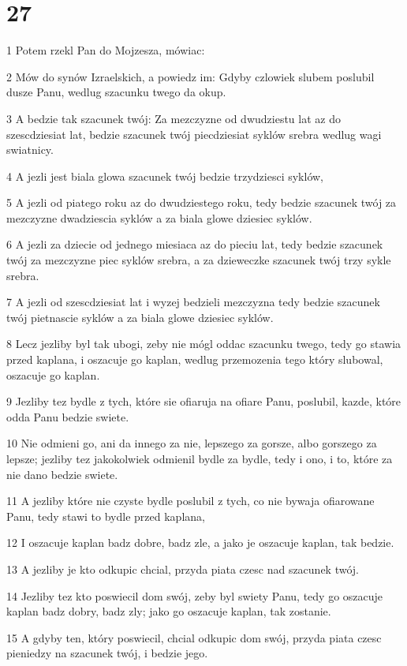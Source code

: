 \chapter{27}

\par 1 Potem rzekl Pan do Mojzesza, mówiac:
\par 2 Mów do synów Izraelskich, a powiedz im: Gdyby czlowiek slubem poslubil dusze Panu, wedlug szacunku twego da okup.
\par 3 A bedzie tak szacunek twój: Za mezczyzne od dwudziestu lat az do szescdziesiat lat, bedzie szacunek twój piecdziesiat syklów srebra wedlug wagi swiatnicy.
\par 4 A jezli jest biala glowa szacunek twój bedzie trzydziesci syklów,
\par 5 A jezli od piatego roku az do dwudziestego roku, tedy bedzie szacunek twój za mezczyzne dwadziescia syklów a za biala glowe dziesiec syklów.
\par 6 A jezli za dziecie od jednego miesiaca az do pieciu lat, tedy bedzie szacunek twój za mezczyzne piec syklów srebra, a za dzieweczke szacunek twój trzy sykle srebra.
\par 7 A jezli od szescdziesiat lat i wyzej bedzieli mezczyzna tedy bedzie szacunek twój pietnascie syklów a za biala glowe dziesiec syklów.
\par 8 Lecz jezliby byl tak ubogi, zeby nie mógl oddac szacunku twego, tedy go stawia przed kaplana, i oszacuje go kaplan, wedlug przemozenia tego który slubowal, oszacuje go kaplan.
\par 9 Jezliby tez bydle z tych, które sie ofiaruja na ofiare Panu, poslubil, kazde, które odda Panu bedzie swiete.
\par 10 Nie odmieni go, ani da innego za nie, lepszego za gorsze, albo gorszego za lepsze; jezliby tez jakokolwiek odmienil bydle za bydle, tedy i ono, i to, które za nie dano bedzie swiete.
\par 11 A jezliby które nie czyste bydle poslubil z tych, co nie bywaja ofiarowane Panu, tedy stawi to bydle przed kaplana,
\par 12 I oszacuje kaplan badz dobre, badz zle, a jako je oszacuje kaplan, tak bedzie.
\par 13 A jezliby je kto odkupic chcial, przyda piata czesc nad szacunek twój.
\par 14 Jezliby tez kto poswiecil dom swój, zeby byl swiety Panu, tedy go oszacuje kaplan badz dobry, badz zly; jako go oszacuje kaplan, tak zostanie.
\par 15 A gdyby ten, który poswiecil, chcial odkupic dom swój, przyda piata czesc pieniedzy na szacunek twój, i bedzie jego.
